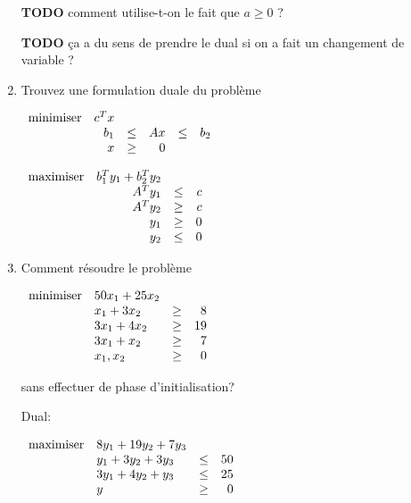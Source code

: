 \begin{enumerate}
\begin{solution}
      \textbf{TODO} comment utilise-t-on le fait que $a \geq 0$ ?

      \textbf{TODO} ça a du sens de prendre le dual si on a fait un changement
      de variable ?
    \end{solution}

  \item Trouvez une formulation duale du  problème

    $
    \begin{array}{lrcrcrcr}
      \mbox{minimiser} & c^T x\\
      & b_1 & \leq & A x & \leq &  b_2\\
      & x   & \geq & 0
    \end{array}
    $

    \begin{solution}
      $
      \begin{array}{lrcrcrcr}
        \mbox{maximiser} & b_{1}^{T}y_{1} + b_{2}^{T}y_{2}\\
        & A^{T}y_{1} & \leq & c\\
        & A^{T}y_{2} & \geq & c\\
        & y_1 & \geq & 0\\
        & y_2 & \leq & 0
      \end{array}
      $
    \end{solution}


  \item Comment résoudre le problème

    $
    \begin{array}{llcr}
      \mbox{minimiser} & 50x_1+25x_2\\
      & x_1+3x_2 & \geq & 8\\
      & 3x_1+4x_2 & \geq & 19\\
      & 3x_1+x_2 & \geq & 7\\
      & x_1, x_2 & \geq & 0
    \end{array}
    $

    sans effectuer de phase d'initialisation?


    \begin{solution}
      Dual:

      $
      \begin{array}{llcr}
        \mbox{maximiser} & 8y_{1} + 19y_{2} + 7y_{3}\\
        & y_1 + 3y_2 + 3y_3 & \leq & 50\\
        & 3y_1 + 4y_2 + y_3 & \leq & 25\\
        & y & \geq & 0
      \end{array}
      $


\end{solution}
\end{enumerate}
